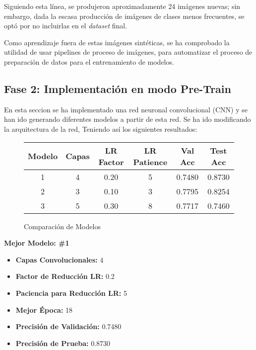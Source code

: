 \noindent
Siguiendo esta línea, 
se produjeron aproximadamente 24 imágenes nuevas; sin embargo, dada la escasa producción 
de imágenes de clases menos frecuentes, se optó por no incluirlas en el \textit{dataset} final.

\quad

\noindent
Como aprendizaje fuera de estas imágenes sintéticas, se ha comprobado la utilidad de usar pipelines de
proceso de imágenes, para automatizar el proceso de preparación de datos para el entrenamiento de modelos.


\subsection{Fase 2: Implementación en modo Pre-Train}

En esta seccion se ha implementado una red neuronal convolucional (CNN) y se han
ido generando diferentes modelos a partir de esta red. Se ha ido modificando la arquitectura de la red,
Teniendo así los siguientes resultados:


\begin{figure}[H]
    \centering
    \begin{tabular}{|c|c|c|c|c|c|}
        \hline
        \textbf{Modelo} & \textbf{Capas} & \textbf{LR Factor} & \textbf{LR Patience} & \textbf{Val Acc} & \textbf{Test Acc} \\ \hline
        1 & 4 & 0.20 & 5 & 0.7480 & 0.8730 \\ \hline
        2 & 3 & 0.10 & 3 & 0.7795 & 0.8254 \\ \hline
        3 & 5 & 0.30 & 8 & 0.7717 & 0.7460 \\ \hline
    \end{tabular}
    \caption{Comparación de Modelos}
\end{figure}

\begin{center}
    \textbf{Mejor Modelo: \#1}
\end{center}

\begin{itemize}
    \item \textbf{Capas Convolucionales:} 4
    \item \textbf{Factor de Reducción LR:} 0.2
    \item \textbf{Paciencia para Reducción LR:} 5
    \item \textbf{Mejor Época:} 18
    \item \textbf{Precisión de Validación:} 0.7480
    \item \textbf{Precisión de Prueba:} 0.8730
\end{itemize}

